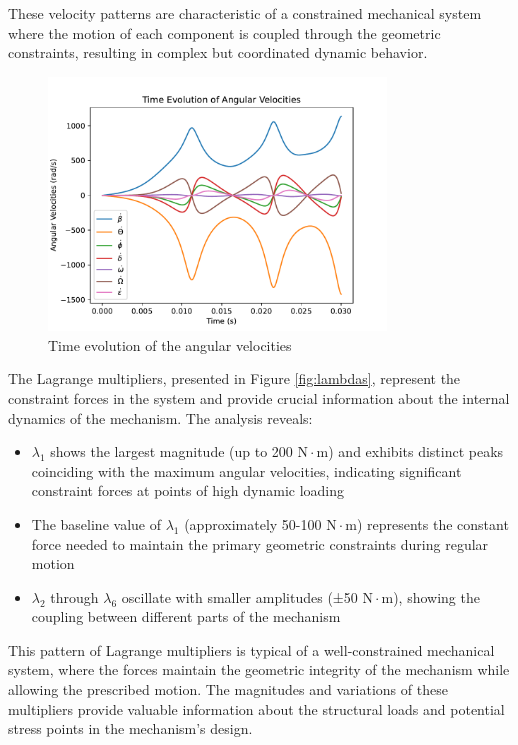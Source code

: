 \documentclass{article}
\begin{document}
These velocity patterns are characteristic of a constrained mechanical system where the motion of each component is coupled through the geometric constraints, resulting in complex but coordinated dynamic behavior.

\begin{figure}[H]
    \centering
    \includegraphics[width=0.8\textwidth]{plots/velocities.pdf}
    \caption{Time evolution of the angular velocities}
    \label{fig:velocities}
\end{figure}

\FloatBarrier

The Lagrange multipliers, presented in Figure \ref{fig:lambdas}, represent the constraint forces in the system and provide crucial information about the internal dynamics of the mechanism. The analysis reveals:

\begin{itemize}
    \item $\lambda_1$ shows the largest magnitude (up to 200 $\mathrm{N}\cdot\mathrm{m}$) and exhibits distinct peaks coinciding with the maximum angular velocities, indicating significant constraint forces at points of high dynamic loading
    \item The baseline value of $\lambda_1$ (approximately 50-100 $\mathrm{N}\cdot\mathrm{m}$) represents the constant force needed to maintain the primary geometric constraints during regular motion
    \item $\lambda_2$ through $\lambda_6$ oscillate with smaller amplitudes (±50 $\mathrm{N}\cdot\mathrm{m}$), showing the coupling between different parts of the mechanism
\end{itemize}

This pattern of Lagrange multipliers is typical of a well-constrained mechanical system, where the forces maintain the geometric integrity of the mechanism while allowing the prescribed motion. The magnitudes and variations of these multipliers provide valuable information about the structural loads and potential stress points in the mechanism's design.
\end{document}
